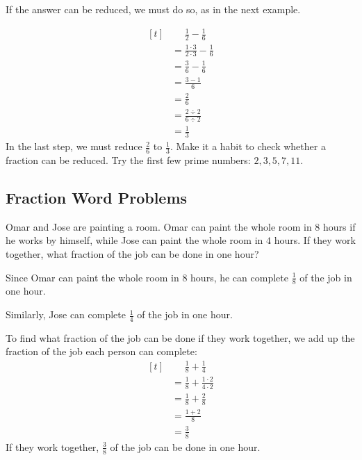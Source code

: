 If the answer can be reduced, we must do so, as in the next example.

\begin{myexample}
\[ 
\begin{aligned}[t]
	&\phantom{{}=}\frac{1}{2}-\frac{1}{6} \\
	&=\frac{1\cdot3}{2\cdot3}-\frac{1}{6} \\
	&=\frac{3}{6}-\frac{1}{6} \\
	&=\frac{3-1}{6} \\
	&=\frac{2}{6} \\
	&=\frac{2\div2}{6\div2} \\
	&=\frac{1}{3} 
\end{aligned}
\]
In the last step, we must reduce $\frac{2}{6}$ to $\frac{1}{3}$. Make it a habit to check whether a fraction can be reduced. Try the first few prime numbers: $2,3,5,7,11$.
\end{myexample}

\subsection{Fraction Word Problems}
\begin{myexample}
Omar and Jose are painting a room. Omar can paint the whole room in $8$ hours if he works by himself, while Jose can paint the whole room in $4$ hours. If they work together, what fraction of the job can be done in one hour?
\end{myexample}
\begin{solution}
Since Omar can paint the whole room in $8$ hours, he can complete $\frac{1}{8}$ of the job in one hour.

Similarly, Jose can complete $\frac{1}{4}$ of the job in one hour.

To find what fraction of the job can be done if they work together, we add up the fraction of the job each person can complete:
\[ 
\begin{aligned}[t]
	&\phantom{{}=}\frac{1}{8}+\frac{1}{4} \\
	&=\frac{1}{8}+\frac{1\cdot2}{4\cdot2} \\
	&=\frac{1}{8}+\frac{2}{8} \\
	&=\frac{1+2}{8} \\
	&=\frac{3}{8} 
\end{aligned}
\]
If they work together, $\frac{3}{8}$ of the job can be done in one hour.
\end{solution}


